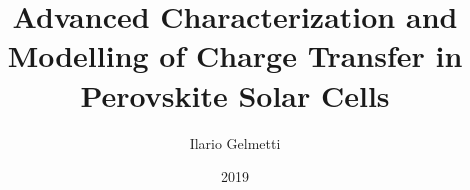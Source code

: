 \documentclass[b5paper, 12pt, openright]{book} %
\title{Advanced Characterization and Modelling of Charge Transfer in Perovskite Solar Cells}
\author{Ilario Gelmetti}
\date{2019}
\begin{document}
\nocite{Gelmetti2017,Moia2019,Gelmetti2019}

\pagestyle{plain}


\makeatletter%
\cleardoublepage%
%
\makeatother%
%
%
\end{document}
